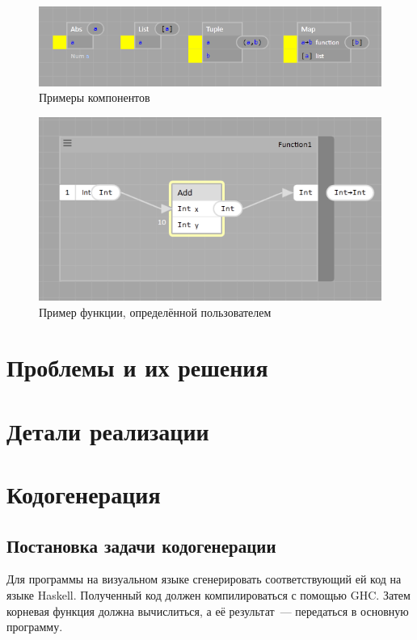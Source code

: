 \begin{figure}[h]
	\includegraphics{img/components.PNG}
	\caption{Примеры компонентов}\label{components}	
\end{figure}
\begin{figure}[h]
	\includegraphics{img/custom_function.PNG}
	\caption{Пример функции, определённой пользователем}\label{customfun}	
\end{figure}

\chapter{Проблемы и их решения}

\chapter{Детали реализации}

\chapter{Кодогенерация}
\section{Постановка задачи кодогенерации}
Для программы на визуальном языке сгенерировать соответствующий ей код на языке Haskell. Полученный код должен компилироваться с помощью GHC. Затем корневая функция должна вычислиться, а её результат~--- передаться в основную программу.
